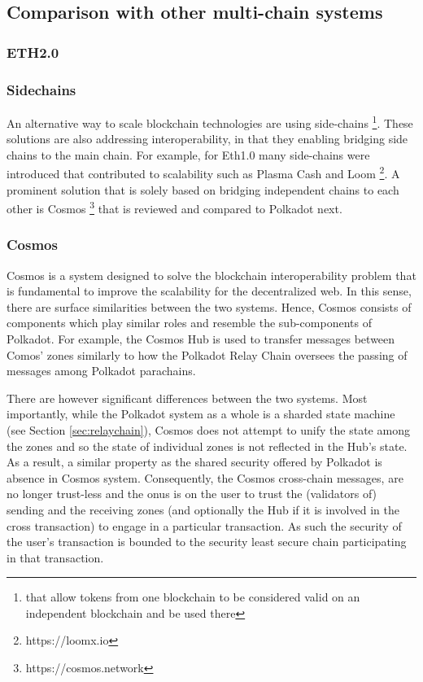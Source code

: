 \subsection{Comparison with other multi-chain systems}\label{sec:comparison}
\subsubsection{ETH2.0}


\subsubsection{Sidechains}
An alternative way to scale blockchain technologies are using side-chains \footnote{that allow tokens from one blockchain to be considered valid on an independent blockchain and be used there}. These solutions are also addressing interoperability, in that they enabling bridging side chains to the main chain. For example, for Eth1.0 many side-chains were introduced that contributed to scalability such as Plasma Cash and Loom \footnote{https://loomx.io}.
A prominent solution that is solely based on bridging independent chains to each other is Cosmos \footnote{https://cosmos.network} that is reviewed and compared to Polkadot next.


\subsubsection{Cosmos}

Cosmos is a system designed to solve the blockchain interoperability problem that is fundamental to improve the scalability for the decentralized web. In this sense, there are surface similarities between the two systems. Hence, Cosmos consists of components which play similar roles and resemble the sub-components of Polkadot. For example, the Cosmos Hub is used to transfer messages between Comos' zones similarly to how the Polkadot Relay Chain oversees the passing of messages among Polkadot parachains.

There are however significant differences between the two systems. Most importantly, while the Polkadot system as a whole is a sharded state machine (see Section \ref{sec:relaychain}), Cosmos does not attempt to unify the state among the zones and so the state of individual zones is not reflected in the Hub's state. As a result, a similar property as the shared security offered by Polkadot is absence in Cosmos system. Consequently, the Cosmos cross-chain messages, are no longer trust-less and the onus is on the user to trust the (validators of) sending and the receiving zones (and optionally the Hub if it is involved in the cross transaction) to engage in a particular transaction. As such the security of the user's transaction is bounded to the security least secure chain participating in that transaction. 

